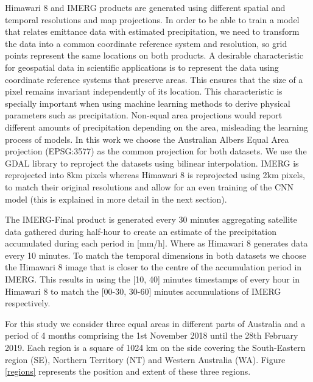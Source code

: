 \documentclass[3p,times]{elsarticle}
\begin{document}
Himawari 8 and IMERG products are generated using different spatial and temporal resolutions and map projections. In order to be able to train a model that relates emittance data with estimated precipitation, we need to transform the data into a common coordinate reference system and resolution, so grid points represent the same locations on both products. A desirable characteristic for geospatial data in scientific applications is to represent the data using coordinate reference systems that preserve areas. This ensures that the size of a pixel remains invariant independently of its location. This characteristic is specially important when using machine learning methods to derive physical parameters such as precipitation. Non-equal area projections would report different amounts of precipitation depending on the area, misleading the learning process of models. In this work we choose the Australian Albers Equal Area projection (EPSG:3577) as the common projection for both datasets. We use the GDAL library \citep{warmerdam2008geospatial} to reproject the datasets using bilinear interpolation. IMERG is reprojected into 8km pixels whereas Himawari 8 is reprojected using 2km pixels, to match their original resolutions and allow for an even training of the CNN model (this is explained in more detail in the next section).

The IMERG-Final product is generated every 30 minutes aggregating satellite data gathered during half-hour to create an estimate of the precipitation accumulated during each period in [mm/h]. Where as Himawari 8 generates data every 10 minutes. To match the temporal dimensions in both datasets we choose the Himawari 8 image that is closer to the centre of the accumulation period in IMERG. This results in using the [10, 40] minutes timestamps of every hour in Himawari 8 to match the [00-30, 30-60] minutes accumulations of IMERG respectively.

For this study we consider three equal areas in different parts of Australia and a period of 4 months comprising the 1st November 2018 until the 28th February 2019. Each region is a square of 1024 km on the side covering the South-Eastern region (SE), Northern Territory (NT) and Western Australia (WA). Figure \ref{regions} represents the position and extent of these three regions.
\end{document}
